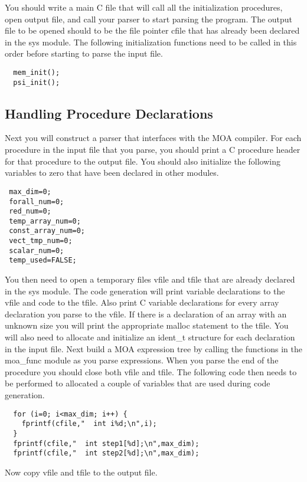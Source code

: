   You should write a main C file that will call all the initialization 
procedures, open output file, and call your parser to start parsing the program.
The output file to be opened should to be the file pointer cfile that has
already been declared in the sys module.  The following initialization
functions need to be called in this order before starting to parse the 
input file.
\begin{verbatim}
  mem_init();
  psi_init();
\end{verbatim}

\subsection{Handling Procedure Declarations}
  Next you will construct a parser that interfaces with the MOA compiler.
For each procedure in the input file that you parse, you should print a C
procedure header for that procedure to the output file.  You should also 
initialize the following variables to zero that have been declared in other 
modules.

\begin{verbatim}
 max_dim=0;
 forall_num=0;
 red_num=0;
 temp_array_num=0;
 const_array_num=0;
 vect_tmp_num=0;
 scalar_num=0;
 temp_used=FALSE;
\end{verbatim}

  You then need to open a temporary files vfile and tfile that are already 
declared in the sys module.  The code generation will print variable 
declarations to the vfile and code to the tfile.  Also print C variable 
declarations for every array declaration you parse to the vfile.  If there is a
declaration of an array with an unknown size you will print the appropriate 
malloc statement to the tfile.  You will also need to allocate and initialize 
an ident\_t structure for each declaration in the input file.  Next build a MOA
expression tree by calling the functions in the moa\_func module as you parse 
expressions.  When you parse the end of the procedure you should close both
vfile and tfile.  The following code then needs to be performed to allocated
a couple of variables that are used during code generation.

\begin{verbatim}
  for (i=0; i<max_dim; i++) {
    fprintf(cfile,"  int i%d;\n",i);
  }
  fprintf(cfile,"  int step1[%d];\n",max_dim);
  fprintf(cfile,"  int step2[%d];\n",max_dim);
\end{verbatim}

Now copy vfile and tfile to the output file.

